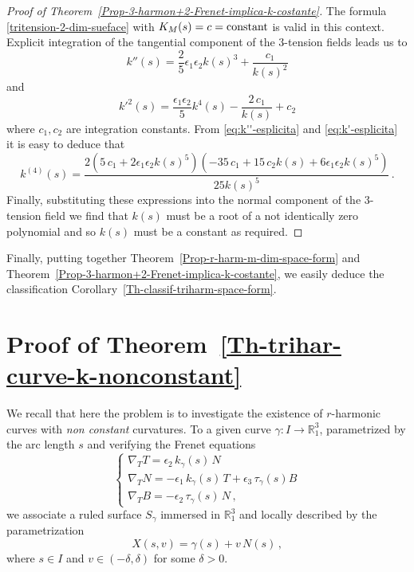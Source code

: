 \documentclass[11pt]{amsart}
\theoremstyle{plain}
\theoremstyle{definition}
\numberwithin{equation}{section}
\def \R{{\mathbb R}}
\begin{document}
\begin{proof}[Proof of Theorem~\ref{Prop-3-harmon+2-Frenet-implica-k-costante}] The formula \eqref{tritension-2-dim-sueface} with $K_M(s)=c={\rm constant}$ is valid in this context. Explicit integration of the tangential component of the $3$-tension fields leads us to
\begin{equation}\label{eq:k''-esplicita}
k''(s)=\frac{2}{5} \epsilon_1 \epsilon_2 k(s)^3+\frac{c_1}{k(s)^2}
\end{equation}
and
\begin{equation}\label{eq:k'-esplicita}
k'^2(s)= \frac{\epsilon_1 \epsilon_2}{5} k^4(s)-\frac{2\,c_1}{k(s)}+c_2
\end{equation}
where $c_1,c_2$ are integration constants. From \eqref{eq:k''-esplicita} and \eqref{eq:k'-esplicita} it is easy to deduce that 
\[
k^{(4)}(s)=\frac{2 \left(5 \,c_1+2 \epsilon_1 \epsilon_2 k(s)^5\right) \left(-35 \,c_1+15 \,c_2 k(s)+6\epsilon_1 \epsilon_2 k(s)^5\right)}{25 k(s)^5}\,.
\]
Finally, substituting these expressions into the normal component of the $3$-tension field we find that $k(s)$ must be a root of a not identically zero polynomial and so $k(s)$ must be a constant as required.
\end{proof}
Finally, putting together Theorem~\ref{Prop-r-harm-m-dim-space-form} and Theorem~\ref{Prop-3-harmon+2-Frenet-implica-k-costante}, we easily deduce the classification Corollary~\ref{Th-classif-triharm-space-form}. 

\section{Proof of Theorem~\ref{Th-trihar-curve-k-nonconstant}}\label{Sec-curva-curvatura-non-costante}
 
We recall that here the problem is to investigate the existence of $r$-harmonic curves with \textit{non constant} curvatures. To a given curve $\gamma: I \to \R^3_1$, parametri\-zed by the arc length $s$ and verifying the Frenet equations
\begin{equation}\label{eq-Frenet-R3,bis}
\begin{cases}
\nabla_T T = \epsilon_2 \,k_\gamma(s) \,N \\
\nabla_T N =-\epsilon_1\,k_\gamma(s) \,T + \epsilon_3 \, \tau_\gamma(s) B \\
\nabla_T B = - \epsilon_2 \,\tau_\gamma(s) \,N \,,
\end{cases}
\end{equation}
we associate a ruled surface $S_\gamma$ immersed in $\R^3_1$ and locally described by the parametrization
\begin{equation}\label{eq-S-parametrisation}
X(s,v)=\gamma(s)+v\,N(s) \,,
\end{equation}
where $s\in I$ and $v \in (-\delta, \delta)$ for some $\delta>0$.
\end{document}
